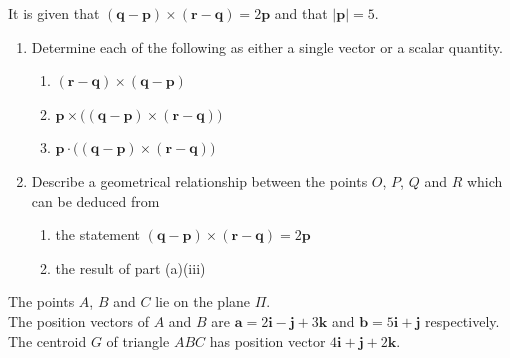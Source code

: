 \documentclass[leqno]{article}
\begin{document}
\begin{enumerate}[
  label=\textbf{\arabic*.},
  leftmargin=*,
  topsep=0pt,
  partopsep=0pt,
  parsep=0pt
]
It is given that $(\mathbf{q}-\mathbf{p}) \times (\mathbf{r}-\mathbf{q}) = 2\mathbf{p}$ and that $\lvert \mathbf{p} \rvert = 5$. \\

\begin{enumerate}[label=\textbf{(\alph*)}]
  \item Determine each of the following as either a single vector or a scalar quantity.
  \begin{enumerate}[label=(\roman*)]
    \item $(\mathbf{r}-\mathbf{q}) \times (\mathbf{q}-\mathbf{p})$ 
    \item $\mathbf{p} \times \big((\mathbf{q}-\mathbf{p}) \times (\mathbf{r}-\mathbf{q})\big)$ 
    \item $\mathbf{p} \cdot \big((\mathbf{q}-\mathbf{p}) \times (\mathbf{r}-\mathbf{q})\big)$  \\
  \end{enumerate}
  \item Describe a geometrical relationship between the points $O$, $P$, $Q$ and $R$ which can be deduced from
  \begin{enumerate}[label=(\roman*)]
    \item the statement $(\mathbf{q}-\mathbf{p}) \times (\mathbf{r}-\mathbf{q}) = 2\mathbf{p}$ 
    \item the result of part (a)(iii)  \\
  \end{enumerate}
\end{enumerate}

\newpage

\questionitem

The points $A$, $B$ and $C$ lie on the plane $\Pi$. \\

The position vectors of $A$ and $B$ are $\mathbf{a}=2\mathbf{i}-\mathbf{j}+3\mathbf{k}$ and $\mathbf{b}=5\mathbf{i}+\mathbf{j}$ respectively. \\

The centroid $G$ of triangle $ABC$ has position vector $4\mathbf{i}+\mathbf{j}+2\mathbf{k}$. \\


\end{enumerate}
\end{document}
